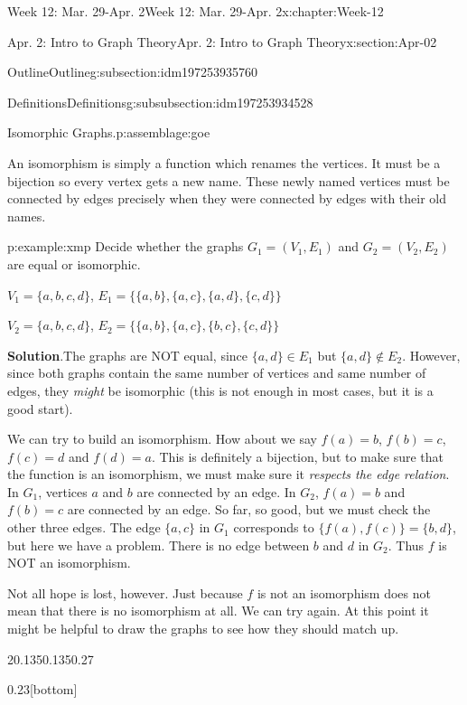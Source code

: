 \documentclass[oneside,10pt,]{book}
\newcommand{\blocktitlefont}{\relax}
\numberwithin{equation}{section}
\begin{document}
\begin{chapterptx}{Week 12: Mar. 29-Apr. 2}{}{Week 12: Mar. 29-Apr. 2}{}{}{x:chapter:Week-12}
\begin{sectionptx}{Apr. 2: Intro to Graph Theory}{}{Apr. 2: Intro to Graph Theory}{}{}{x:section:Apr-02}
\begin{subsectionptx}{Outline}{}{Outline}{}{}{g:subsection:idm197253935760}
\begin{subsubsectionptx}{Definitions}{}{Definitions}{}{}{g:subsubsection:idm197253934528}
\begin{assemblage}{Isomorphic Graphs.}{p:assemblage:goe}
\end{assemblage}
An isomorphism is simply a function which renames the vertices. It must be a bijection so every vertex gets a new name. These newly named vertices must be connected by edges precisely when they were connected by edges with their old names.%
\begin{example}{}{p:example:xmp}%
Decide whether the graphs \(G_1 = (V_1, E_1)\) and \(G_2 = (V_2, E_2)\) are equal or isomorphic.%
\par
\(V_1 = \{a,b,c,d\}\), \(E_1 = \{\{a,b\}, \{a,c\}, \{a,d\}, \{c,d\}\}\)%
\par
\(V_2 = \{a,b,c,d\}\), \(E_2 = \{\{a,b\}, \{a,c\}, \{b,c\}, \{c,d\}\}\)%
\par\smallskip%
\noindent\textbf{\blocktitlefont Solution}.\hypertarget{p:solution:jSE}{}\quad{}The graphs are NOT equal, since \(\{a,d\} \in E_1\) but \(\{a,d\} \notin E_2\). However, since both graphs contain the same number of vertices and same number of edges, they \emph{might} be isomorphic (this is not enough in most cases, but it is a good start).%
\par
We can try to build an isomorphism. How about we say \(f(a) = b\), \(f(b) = c\), \(f(c) = d\) and \(f(d) = a\). This is definitely a bijection, but to make sure that the function is an isomorphism, we must make sure it \emph{respects the edge relation}. In \(G_1\), vertices \(a\) and \(b\) are connected by an edge. In \(G_2\), \(f(a) = b\) and \(f(b) = c\) are connected by an edge. So far, so good, but we must check the other three edges. The edge \(\{a,c\}\) in \(G_1\) corresponds to \(\{f(a),
f(c)\} = \{b,d\}\), but here we have a problem. There is no edge between \(b\) and \(d\) in \(G_2\). Thus \(f\) is NOT an isomorphism.%
\par
Not all hope is lost, however. Just because \(f\) is not an isomorphism does not mean that there is no isomorphism at all. We can try again. At this point it might be helpful to draw the graphs to see how they should match up.%
\begin{sidebyside}{2}{0.135}{0.135}{0.27}%
\begin{sbspanel}{0.23}[bottom]%
\end{sbspanel}
\end{sidebyside}
\end{example}
\end{subsubsectionptx}
\end{subsectionptx}
\end{sectionptx}
\end{chapterptx}
\end{document}
